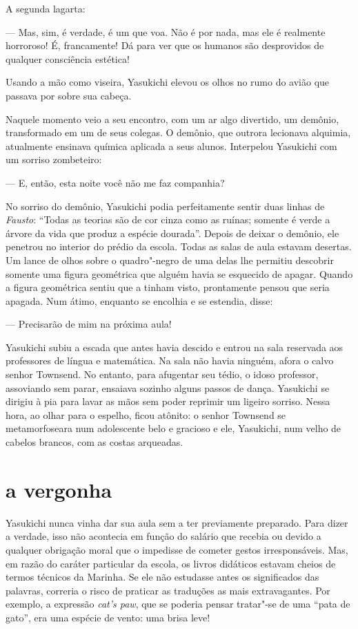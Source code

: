A segunda lagarta:

--- Mas, sim, é verdade, é um que voa. Não é por nada, mas ele é realmente
horroroso! É, francamente! Dá para ver que os humanos são desprovidos
de qualquer consciência estética!

Usando a mão como viseira, Yasukichi elevou os olhos no rumo do avião
que passava por sobre sua cabeça.

Naquele momento veio a seu encontro, com um ar algo divertido, um
demônio, transformado em um de seus colegas. O demônio, que outrora
lecionava alquimia, atualmente ensinava química aplicada a seus alunos.
Interpelou Yasukichi com um sorriso zombeteiro:

--- E, então, esta noite você não me faz companhia?

No sorriso do demônio, Yasukichi podia perfeitamente sentir duas linhas
de \textit{Fausto}: ``Todas as teorias são de cor cinza como as ruínas;
somente é verde a árvore da vida que produz a espécie dourada''. Depois
de deixar o demônio, ele penetrou no interior do prédio da escola.
Todas as salas de aula estavam desertas. Um lance de olhos sobre o
quadro"-negro de uma delas lhe permitiu descobrir somente uma figura
geométrica que alguém havia se esquecido de apagar. Quando a figura
geométrica sentiu que a tinham visto, prontamente pensou que seria
apagada. Num átimo, enquanto se encolhia e se estendia, disse:

--- Precisarão de mim na próxima aula!

Yasukichi subiu a escada que antes havia descido e entrou na sala
reservada aos professores de língua e matemática. Na sala não havia
ninguém, afora o calvo senhor Townsend. No entanto, para afugentar seu
tédio, o idoso professor, assoviando sem parar, ensaiava sozinho alguns
passos de dança. Yasukichi se dirigiu à pia para lavar as mãos sem
poder reprimir um ligeiro sorriso. Nessa hora, ao olhar para o espelho,
ficou atônito: o senhor Townsend se metamorfoseara num adolescente belo
e gracioso e ele, Yasukichi, num velho de cabelos brancos, com as
costas arqueadas.

\section*{a vergonha}

Yasukichi nunca vinha dar sua aula sem a ter previamente preparado. Para
dizer a verdade, isso não acontecia em função do salário que recebia ou
devido a qualquer obrigação moral que o impedisse de cometer gestos
irresponsáveis. Mas, em razão do caráter particular da escola, os
livros didáticos estavam cheios de termos técnicos da Marinha. Se ele
não estudasse antes os significados das palavras, correria o risco de
praticar as traduções as mais extravagantes. Por exemplo, a expressão
\textit{cat's paw}, que se poderia pensar tratar"-se de uma ``pata de
gato'', era uma espécie de vento: uma brisa leve!

